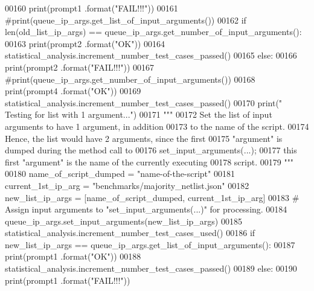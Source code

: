 \begin{DoxyCode}
00160                 print(prompt1 .format(\textcolor{stringliteral}{"FAIL!!!"}))
00161                 \textcolor{comment}{#print(queue\_ip\_args.get\_list\_of\_input\_arguments())}
00162             \textcolor{keywordflow}{if} len(old\_list\_ip\_args) == queue\_ip\_args.get\_number\_of\_input\_arguments():
00163                 print(prompt2 .format(\textcolor{stringliteral}{"OK"}))
00164                 statistical\_analysis.increment\_number\_test\_cases\_passed()
00165             \textcolor{keywordflow}{else}:
00166                 print(prompt2 .format(\textcolor{stringliteral}{"FAIL!!!"}))
00167                 \textcolor{comment}{#print(queue\_ip\_args.get\_number\_of\_input\_arguments())}
00168             print(prompt4 .format(\textcolor{stringliteral}{"OK"}))
00169             statistical\_analysis.increment\_number\_test\_cases\_passed()
00170         print(\textcolor{stringliteral}{" Testing for list with 1 argument..."})
00171         \textcolor{stringliteral}{"""}
00172 \textcolor{stringliteral}{            Set the list of input arguments to have 1 argument, in addition}
00173 \textcolor{stringliteral}{                to the name of the script.}
00174 \textcolor{stringliteral}{            Hence, the list would have 2 arguments, since the first}
00175 \textcolor{stringliteral}{                "argument" is dumped during the method call to}
00176 \textcolor{stringliteral}{                set\_input\_arguments(...);}
00177 \textcolor{stringliteral}{                this first "argument" is the name of the currently executing}
00178 \textcolor{stringliteral}{                    script.}
00179 \textcolor{stringliteral}{        """}
00180         name\_of\_script\_dumped = \textcolor{stringliteral}{"name-of-the-script"}
00181         current\_1st\_ip\_arg = \textcolor{stringliteral}{"benchmarks/majority\_netlist.json"}
00182         new\_list\_ip\_args = [name\_of\_script\_dumped, current\_1st\_ip\_arg]
00183         \textcolor{comment}{#   Assign input arguments to "set\_input\_arguments(...)" for processing.}
00184         queue\_ip\_args.set\_input\_arguments(new\_list\_ip\_args)
00185         statistical\_analysis.increment\_number\_test\_cases\_used()
00186         \textcolor{keywordflow}{if} new\_list\_ip\_args == queue\_ip\_args.get\_list\_of\_input\_arguments():
00187             print(prompt1 .format(\textcolor{stringliteral}{"OK"}))
00188             statistical\_analysis.increment\_number\_test\_cases\_passed()
00189         \textcolor{keywordflow}{else}:
00190             print(prompt1 .format(\textcolor{stringliteral}{"FAIL!!!"}))

\end{DoxyCode}
